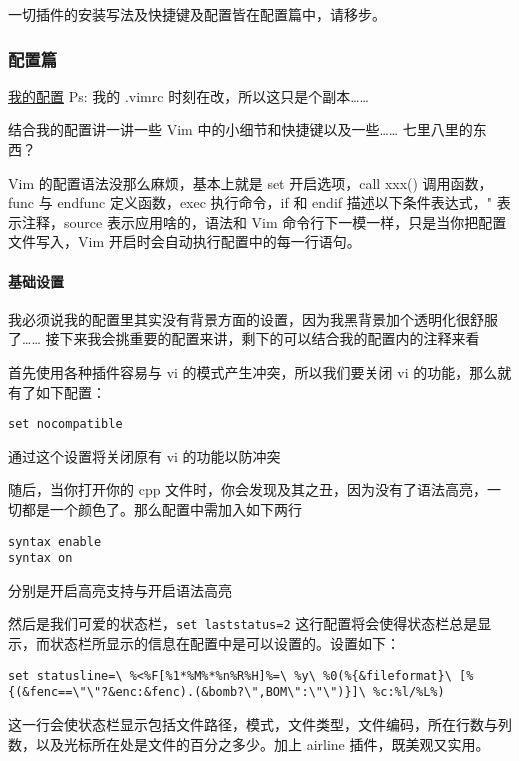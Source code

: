 一切插件的安装写法及快捷键及配置皆在配置篇中，请移步。

\subsubsection{配置篇}

\href{https://github.com/LuoshuiTianyi/Vim-for-OIWiki}{我的配置} Ps: 我的 .vimrc 时刻在改，所以这只是个副本……

结合我的配置讲一讲一些 Vim 中的小细节和快捷键以及一些…… 七里八里的东西？

Vim 的配置语法没那么麻烦，基本上就是 set 开启选项，call xxx() 调用函数，func 与 endfunc 定义函数，exec 执行命令，if 和 endif 描述以下条件表达式，" 表示注释，source 表示应用啥的，语法和 Vim 命令行下一模一样，只是当你把配置文件写入，Vim 开启时会自动执行配置中的每一行语句。

\paragraph{基础设置}

我必须说我的配置里其实没有背景方面的设置，因为我黑背景加个透明化很舒服了…… 接下来我会挑重要的配置来讲，剩下的可以结合我的配置内的注释来看

首先使用各种插件容易与 vi 的模式产生冲突，所以我们要关闭 vi 的功能，那么就有了如下配置：

\begin{verbatim}
set nocompatible
\end{verbatim}

通过这个设置将关闭原有 vi 的功能以防冲突

随后，当你打开你的 cpp 文件时，你会发现及其之丑，因为没有了语法高亮，一切都是一个颜色了。那么配置中需加入如下两行

\begin{verbatim}
syntax enable
syntax on
\end{verbatim}

分别是开启高亮支持与开启语法高亮

然后是我们可爱的状态栏，\texttt{set laststatus=2} 这行配置将会使得状态栏总是显示，而状态栏所显示的信息在配置中是可以设置的。设置如下：

\begin{verbatim}
set statusline=\ %<%F[%1*%M%*%n%R%H]%=\ %y\ %0(%{&fileformat}\ [%{(&fenc==\"\"?&enc:&fenc).(&bomb?\",BOM\":\"\")}]\ %c:%l/%L%)
\end{verbatim}

这一行会使状态栏显示包括文件路径，模式，文件类型，文件编码，所在行数与列数，以及光标所在处是文件的百分之多少。加上 airline 插件，既美观又实用。

